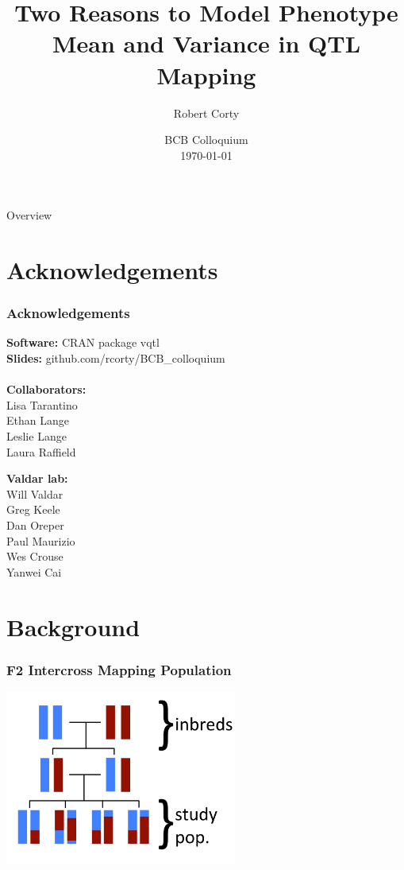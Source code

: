 \documentclass{beamer}
\title{Two Reasons to Model Phenotype\\ Mean and Variance in QTL Mapping}
\author{Robert Corty}
\institute{UNC Chapel Hill}
\date{BCB Colloquium\\\today}
\begin{document}
\begin{frame}
\titlepage
\end{frame}

\begin{frame}{Overview}
\tableofcontents
\end{frame}


\section*{Acknowledgements}
\begin{frame}\frametitle{Acknowledgements}
    \begin{minipage}{0.45\textwidth}
        {\small
        \textbf{Software:} CRAN package vqtl\\
        \textbf{Slides:} github.com/rcorty/BCB\_colloquium\\\\
        \textbf{Collaborators:}\\
        Lisa Tarantino\\
        Ethan Lange\\
        Leslie Lange\\
        Laura Raffield}
    \end{minipage}\hfill
    \begin{minipage}{0.45\textwidth}
        {\small
        \textbf{Valdar lab:}\\
        Will Valdar\\
        Greg Keele\\
        Dan Oreper\\
        Paul Maurizio\\
        Wes Crouse\\
        Yanwei Cai}
    \end{minipage}
\end{frame}


\section{Background}

\begin{frame}\frametitle{F2 Intercross Mapping Population}
    \includegraphics[width = 3in]{F2_diagram}
\end{frame}
\end{document}
